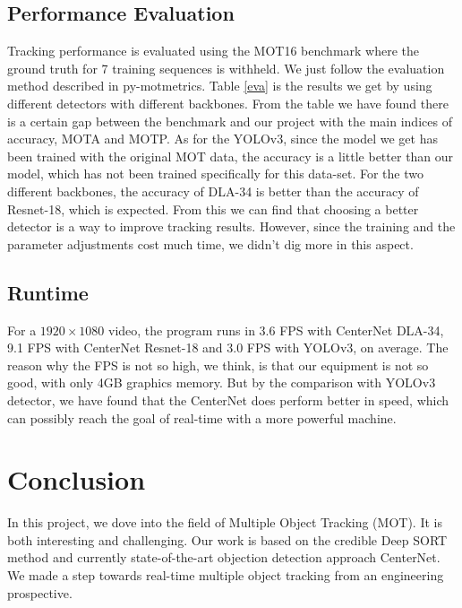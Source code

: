 \documentclass[conference]{IEEEtran}
\begin{document}
\subsection{Performance Evaluation}
Tracking performance is evaluated using the MOT16 benchmark \cite{milan2016mot16} where the ground truth for 7 training sequences is withheld. We just follow the evaluation method described in py-motmetrics. Table \ref{eva} is the results we get by using different detectors with different backbones. From the table we have found there is a certain gap between the benchmark and our project with the main indices of accuracy, MOTA and MOTP. As for the YOLOv3,  since the model we get has been trained with the original MOT data, the accuracy is a little better than our model, which has not been trained specifically for this data-set. For the two different backbones, the accuracy of DLA-34 is better than the accuracy of Resnet-18, which is expected. From this we can find that choosing a better detector is a way to improve tracking results. However, since the training and the parameter adjustments cost much time, we didn't dig more in this aspect.
\subsection{Runtime}
For a $1920 \times 1080$ video, the program runs in 3.6 FPS with CenterNet DLA-34, 9.1 FPS with CenterNet Resnet-18 and 3.0 FPS with YOLOv3, on average. The reason why the FPS is not so high, we think, is that our equipment is not so good, with only 4GB graphics memory. But by the comparison with YOLOv3 detector, we have found that the CenterNet does perform better in speed, which can possibly reach the goal of real-time with a more powerful machine.

\section{Conclusion}

In this project, we dove into the field of Multiple Object Tracking (MOT). It is both interesting and challenging. Our work is based on the credible Deep SORT method and currently state-of-the-art objection detection approach CenterNet. We made a step towards real-time multiple object tracking from an engineering prospective.



\end{document}
